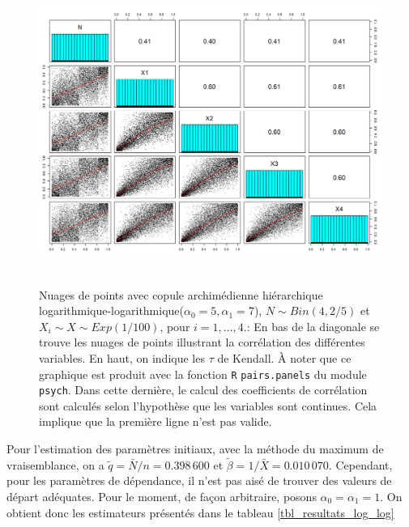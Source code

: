 \documentclass{article}
\begin{document}
		\begin{figure}[H]
			\centering
			\includegraphics[height=10cm]{Graph/scatterplot_log_log.png}
			\caption[Nuages de points du scénario \ref{scenario_log_log}]
			{Nuages de points avec copule archimédienne hiérarchique logarithmique-logarithmique($\alpha_0=5, \alpha_1=7$), $N \sim Bin(4, 2/5)$ et $X_i \sim X \sim Exp(1/100)$, pour $i=1,\dots, 4$.:
				En bas de la diagonale se trouve les nuages de points illustrant la corrélation des différentes variables. En haut, on indique les $\tau$ de Kendall. À noter que ce graphique est produit avec la fonction \texttt{R} \texttt{pairs.panels} du module \texttt{psych}. Dans cette dernière, le calcul des coefficients de corrélation sont calculés selon l'hypothèse que les variables sont continues. Cela implique que la première ligne n'est pas valide.}
			\label{graph_scatterplot_log_log}
		\end{figure}
		
		Pour l'estimation des paramètres initiaux, avec la méthode du maximum de vraisemblance, on a $\tilde{q} = \bar{N}/n = 0.398\,600$ et $\tilde{\beta} = 1/\bar{X} = 0.010\,070$. Cependant, pour les paramètres de dépendance, il n'est pas aisé de trouver des valeurs de départ adéquates. Pour le moment, de façon arbitraire, posons $\alpha_{0}=\alpha_{1}=1$. On obtient donc les estimateurs présentés dans le tableau \ref{tbl_resultats_log_log}
		
\end{document}
